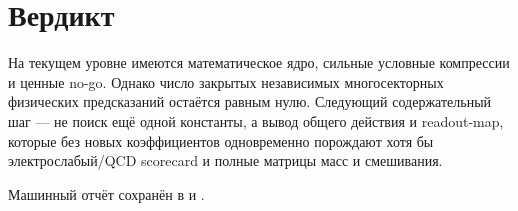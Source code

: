 \documentclass[12pt,a4paper]{article}
\begin{document}
\section{Вердикт}

На текущем уровне имеются математическое ядро, сильные условные компрессии и
ценные no-go. Однако число закрытых независимых многосекторных физических
предсказаний остаётся равным нулю. Следующий содержательный шаг --- не поиск
ещё одной константы, а вывод общего действия и readout-map, которые без новых
коэффициентов одновременно порождают хотя бы электрослабый/QCD scorecard и
полные матрицы масс и смешивания.

Машинный отчёт сохранён в
 и
.
\end{document}
